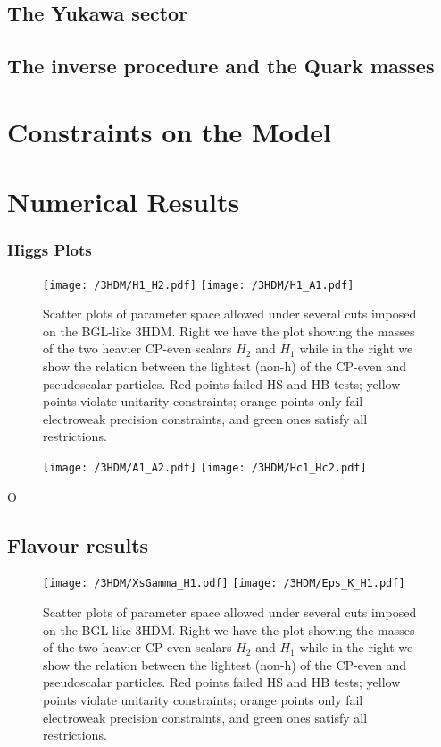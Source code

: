 \subsection{The Yukawa sector}

\subsection{The inverse procedure and the Quark masses}

\section{Constraints on the Model}

\section{Numerical Results}

\subsubsection{Higgs Plots}



\begin{figure}[H]
	\centering
	\texttt{[image: /3HDM/H1\_H2.pdf]}
	\texttt{[image: /3HDM/H1\_A1.pdf]}
	\caption{Scatter plots of parameter space allowed under  several cuts imposed on the BGL-like 3HDM. Right we have the plot showing the masses of the two heavier CP-even scalars $H_2$ and $H_1$ while in the right we show the relation between the lightest
(non-h) of the CP-even and pseudoscalar particles. Red points failed HS and HB tests; yellow points violate unitarity constraints; orange points only fail electroweak precision constraints, and green ones satisfy all restrictions.}
	\label{fig:H1_A1_Plots}
\end{figure}	

\begin{figure}[H]
	\centering
	\texttt{[image: /3HDM/A1\_A2.pdf]}
	\texttt{[image: /3HDM/Hc1\_Hc2.pdf]}
	\caption{}
	\label{fig:Other_H_plots}
\end{figure}	
%
O
%
\subsection{Flavour results}

\begin{figure}[H]
	\centering
	\texttt{[image: /3HDM/XsGamma\_H1.pdf]}
	\texttt{[image: /3HDM/Eps\_K\_H1.pdf]}
	\caption{Scatter plots of parameter space allowed under  several cuts imposed on the BGL-like 3HDM. Right we have the plot showing the masses of the two heavier CP-even scalars $H_2$ and $H_1$ while in the right we show the relation between the lightest
(non-h) of the CP-even and pseudoscalar particles. Red points failed HS and HB tests; yellow points violate unitarity constraints; orange points only fail electroweak precision constraints, and green ones satisfy all restrictions.}
	\label{fig:PT_plots_H1}
\end{figure}	


